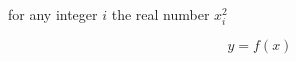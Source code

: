 \documentclass[a4paper]{article}
\begin{document}

for any integer $i$ the real number $x_i^2$

\begin{equation}
    y=f(x)
\end{equation}
\end{document}
